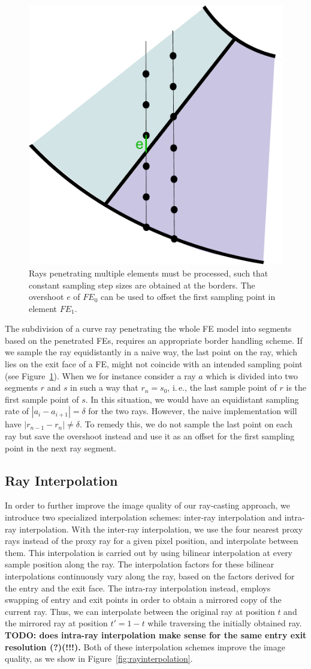 \documentclass[review,journal]{vgtc}         %
\begin{document}
\begin{figure}[t]
    \centering
    \includegraphics[width=0.3\linewidth]{figures/overshoot}
    \caption{Rays penetrating multiple elements must be processed, such that constant sampling step sizes are obtained at the borders. The overshoot $e$ of $FE_0$ can be used to offset the first sampling point in element $FE_1$.}
    \label{fig:overshoot}
\end{figure}

The subdivision of a curve ray penetrating the whole FE model into segments based on the penetrated FEs, requires an appropriate border handling scheme. If we sample the ray equidistantly in a naive way, the last point on the ray, which lies on the exit face of a FE, might not coincide with an intended sampling point (see Figure~\ref{fig:overshoot}). When we for instance consider a ray $a$ which is divided into two segments $r$ and $s$ in such a way that $r_n = s_0$, i.\,e., the last sample point of $r$ is the first sample point of $s$. In this situation, we would have an equidistant sampling rate of $\left|a_i - a_{i+1}\right| = \delta$ for the two rays. However, the naive implementation will have $\left|r_{n-1} - r_{n}\right| \neq \delta$. To remedy this, we do not sample the last point on each ray but save the overshoot instead and use it as an offset for the first sampling point in the next ray segment.

\subsection{Ray Interpolation}

In order to further improve the image quality of our ray-casting approach, we introduce two specialized interpolation schemes: inter-ray interpolation and intra-ray interpolation. With the inter-ray interpolation, we use the four nearest proxy rays  instead of the proxy ray for a given pixel position, and interpolate between them. This interpolation is carried out by using bilinear interpolation at every sample position along the ray. The interpolation factors for these bilinear interpolations continuously vary along the ray, based on the factors derived for the entry and the exit face. The intra-ray interpolation instead, employs swapping of entry and exit points in order to obtain a mirrored copy of the current ray. Thus, we can interpolate between the original ray at position $t$ and the mirrored ray at position $t'=1-t$ while traversing the initially obtained ray. \textbf{TODO: does intra-ray interpolation make sense for the same entry exit resolution (?)(!!!).} Both of these interpolation schemes improve the image quality, as we show in Figure~\ref{fig:rayinterpolation}.
\end{document}
